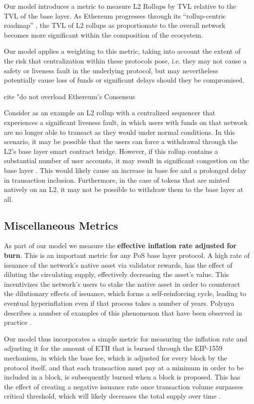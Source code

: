 \documentclass[conference]{IEEEtran}
\begin{document}
Our model introduces a metric to measure L2 Rollups by TVL relative to the TVL of the base layer.  As Ethereum progresses through its “rollup-centric roadmap” \cite{buterin2020}, the TVL of L2 rollups as proportionate to the overall network becomes more significant within the composition of the ecosystem.

Our model applies a weighting to this metric, taking into account the extent of the risk that centralization within these protocols pose, i.e. they may not cause a safety or liveness fault in the underlying protocol, but may nevertheless potentially cause loss of funds or significant delays should they be compromised.

cite "do not overload Ethereum's Consensus

Consider as an example an L2 rollup with a centralized sequencer that experiences a significant liveness fault, in which users with funds on that network are no longer able to transact as they would under normal conditions.  In this scenario, it may be possible that the users can force a withdrawal through the L2's base layer smart contract bridge.  However, if this rollup contains a substantial number of user accounts, it may result in significant congestion on the base layer \cite{gorzny2022ideal}.  This would likely cause an increase in base fee and a prolonged delay in transaction inclusion.  Furthermore, in the case of tokens that are minted natively on an L2, it may not be possible to withdraw them to the base layer at all.

\subsection{Miscellaneous Metrics}

As part of our model we measure the \textbf{effective inflation rate adjusted for burn}.  This is an important metric for any PoS base layer protocol.  A high rate of issuance of the network's native asset via validator rewards, has the effect of diluting the circulating supply, effectively decreasing the asset's value.  This incentivizes the network's users to stake the native asset in order to counteract the dilutionary effects of issuance, which forms a self-reinforcing cycle, leading to eventual hyperinflation even if that process takes a number of years.  Polynya describes a number of examples of this phenomenon that have been observed in practice \cite{polynya2022}. 

Our model thus incorporates a simple metric for measuring the inflation rate and adjusting it for the amount of ETH that is burned through the EIP-1559 mechanism, in which the base fee, which is adjusted for every block by the protocol itself, and that each transaction must pay at a minimum in order to be included in a block, is subsequently burned when a block is proposed.  This has the effect of  creating a negative issuance rate once transaction volume surpasses critical threshold, which will likely decreases the total supply over time \cite{liu2022empirical}.
\end{document}
